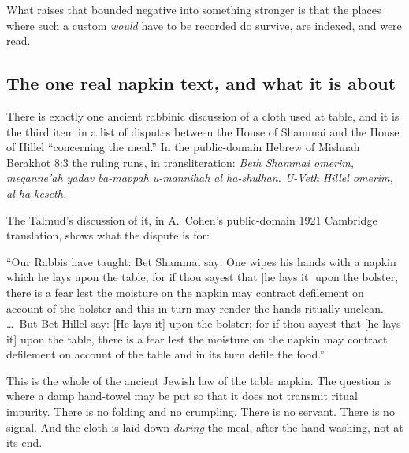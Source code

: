 What raises that bounded negative into something stronger is that the places
where such a custom \emph{would} have to be recorded do survive, are indexed,
and were read.

\subsection{The one real napkin text, and what it is about}

There is exactly one ancient rabbinic discussion of a cloth used at table, and
it is the third item in a list of disputes between the House of Shammai and the
House of Hillel ``concerning the meal.'' In the public-domain Hebrew of
Mishnah Berakhot 8:3 the ruling runs, in transliteration: \emph{Beth Shammai
omerim, meqanne'ah yadav ba-mappah u-mannihah al ha-shulhan. U-Veth
Hillel omerim, al ha-keseth.}

The Talmud's discussion of it, in A.~Cohen's public-domain 1921 Cambridge
translation, shows what the dispute is for:

\begin{studyframe}\small
``Our Rabbis have taught: Bet Shammai say: One wipes his hands with a napkin
which he lays upon the table; for if thou sayest that [he lays it] upon the
bolster, there is a fear lest the moisture on the napkin may contract
defilement on account of the bolster and this in turn may render the hands
ritually unclean. \ldots\ But Bet Hillel say: [He lays it] upon the bolster;
for if thou sayest that [he lays it] upon the table, there is a fear lest the
moisture on the napkin may contract defilement on account of the table and in
its turn defile the food.''
\end{studyframe}

This is the whole of the ancient Jewish law of the table napkin. The question
is where a damp hand-towel may be put so that it does not transmit ritual
impurity. There is no folding and no crumpling. There is no servant. There is
no signal. And the cloth is laid down \emph{during} the meal, after the
hand-washing, not at its end.

